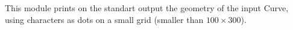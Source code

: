 This module prints on the standart output the
geometry of the input Curve, using characters as dots on a small grid
(smaller than $100\times 300$).

